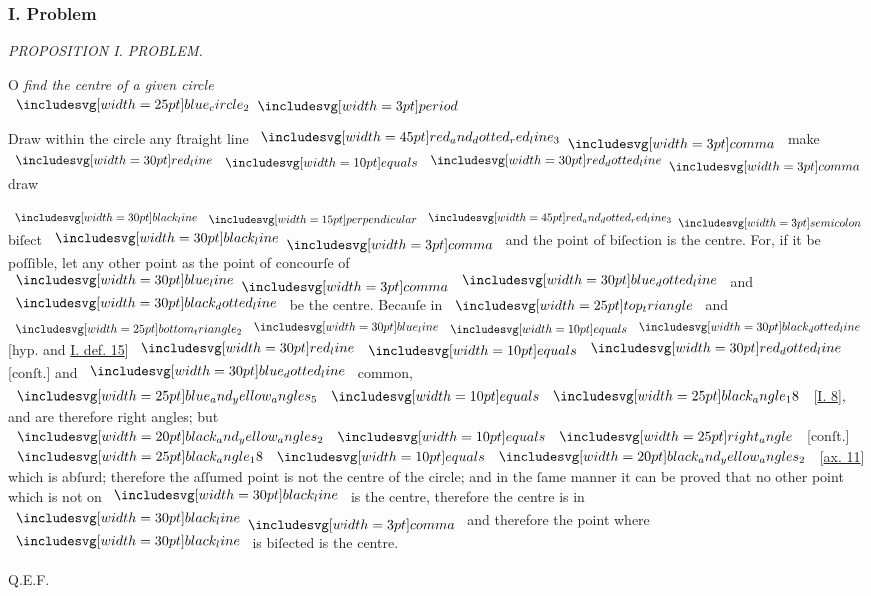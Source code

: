 \documentclass[11pt,preview]{standalone}
\begin{document}
\subsubsection{I. Problem}

\hfill

\begin{minipage}[t]{0.54\textwidth}
    \begin{center}
        \textit{PROPOSITION I. PROBLEM.}\label{book3pr1} \\
    \end{center}

    \hfill

    \begin{center}
        \raggedright \lettrine[lines=3, loversize=1, nindent=0pt]{}{}O \textit{find the centre of a given circle}\\ $\img{blue_circle_2} \bperiod$
    \end{center}

    \hfill

    \hfill

    \raggedright Draw within the circle any ſtraight line $\bimg{red_and_dotted_red_line_3} \bcomma$ make $\redline \bequals \dottedredline \bcomma$ draw
\end{minipage}%
\hfill
\begin{minipage}[t]{0.43\textwidth}
    \vspace{5pt}
    
\end{minipage}

\raggedright $\blackline \bperp \bimg{red_and_dotted_red_line_3} \bsemicolon$ biſect $\blackline \bcomma$ and the point of biſection is the centre. For, if it be poſſible, let any other point as the point of concourſe of $\blueline \bcomma \dottedblueline$ and $\dottedblackline$ be the centre. Becauſe in $\img{top_triangle}$ and $\img{bottom_triangle_2} \blueline \bequals \dottedblackline$ [hyp. and \hyperref[book1def15]{\textsc{I.} def. 15}] $\redline \bequals \dottedredline$ [conſt.] and $\dottedblueline$ common, $\img{blue_and_yellow_angles_5} \bequals \img{black_angle_18}$ [\hyperref[book1pr8]{\textsc{I.} 8}], and are therefore right angles; but $\img[0][0][20]{black_and_yellow_angles_2} \bequals \img{right_angle}$ [conſt.] $\img{black_angle_18} \bequals \img[0][0][20]{black_and_yellow_angles_2}$ [\hyperref[ax11]{ax. 11}] which is abſurd; therefore the aſſumed point is not the centre of the circle;
and in the ſame manner it can be proved that no other point which is not on $\blackline$ is the centre, therefore the centre is in $\blackline \bcomma$ and therefore the point where $\blackline$ is biſected is the centre.

\hfill

\hfill Q.E.F.
\end{document}
